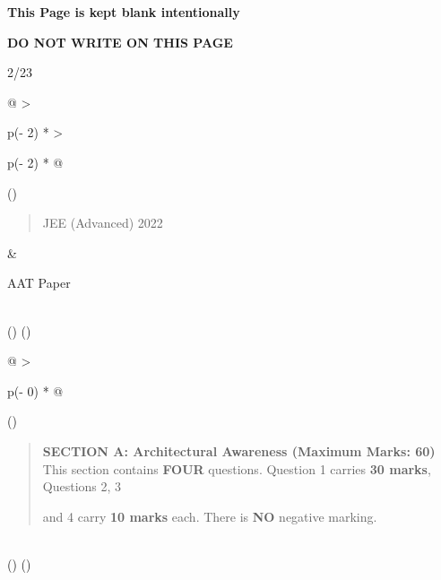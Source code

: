 \documentclass[
]{article}
\begin{document}
\textbf{This Page is kept blank intentionally}

\textbf{DO NOT WRITE ON THIS PAGE}

2/23

\begin{longtable}[]{@{}
  >{\raggedright\arraybackslash}p{(\columnwidth - 2\tabcolsep) * }
  >{\raggedright\arraybackslash}p{(\columnwidth - 2\tabcolsep) * }@{}}
\toprule()
\begin{minipage}[b]{\linewidth}\raggedright
\begin{quote}
JEE (Advanced) 2022
\end{quote}
\end{minipage} & \begin{minipage}[b]{\linewidth}\raggedright
AAT Paper
\end{minipage} \\
\midrule()
\endhead
\bottomrule()
\end{longtable}

\begin{longtable}[]{@{}
  >{\raggedright\arraybackslash}p{(\columnwidth - 0\tabcolsep) * }@{}}
\toprule()
\begin{minipage}[b]{\linewidth}\raggedright
\begin{quote}
\textbf{SECTION A: Architectural Awareness (Maximum Marks: 60)}\\
This section contains \textbf{FOUR} questions. Question 1 carries
\textbf{30 marks}, Questions 2, 3

and 4 carry \textbf{10 marks} each. There is \textbf{NO} negative
marking.
\end{quote}\strut
\end{minipage} \\
\midrule()
\endhead
\bottomrule()
\end{longtable}
\end{document}
